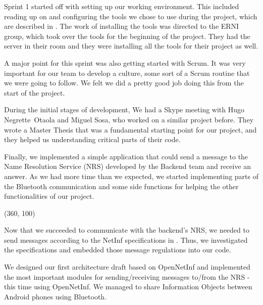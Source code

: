 Sprint 1 started off with setting up our working environment.
This included reading up on and configuring the tools we chose to use during the project,
which are described in . The work of installing the tools was directed to the
ERNI group, which took over the tools for the beginning of the project. They had the
server in their room and they were installing all the tools for their project as well.

A major point for this sprint was also getting started with Scrum. It was very important
for our team to develop a culture, some sort of a Scrum routine that we were going to follow.
We felt we did a pretty good job doing this from the start of the project.

During the initial stages of development, We had a Skype meeting with Hugo Negrette~Otaola and
Miguel Sosa, who worked on a similar project before. They wrote a Master Thesis \cite{hugomiguel}
that was a fundamental starting point for our project, and they helped us understanding
critical parts of their code.

Finally, we implemented a simple application that could send a message to 
the Name Resolution Service (NRS) developed by the Backend team and receive an answer. As
we had more time than we expected, we started implementing parts of the Bluetooth communication and
some side functions for helping the other functionalities of our project.

\framebox(360, 100){
}

Now that we succeeded to communicate with the backend's NRS,
we needed to send messages according to the NetInf specifications in \cite{netinfspecs}.
Thus, we investigated the specifications and embedded those message regulations
into our code. 

We designed our first architecture draft based on OpenNetInf and implemented
the most important modules for sending/receiving messages to/from the NRS -
this time using OpenNetInf. We managed to share Information Objects between
Android phones using Bluetooth.

